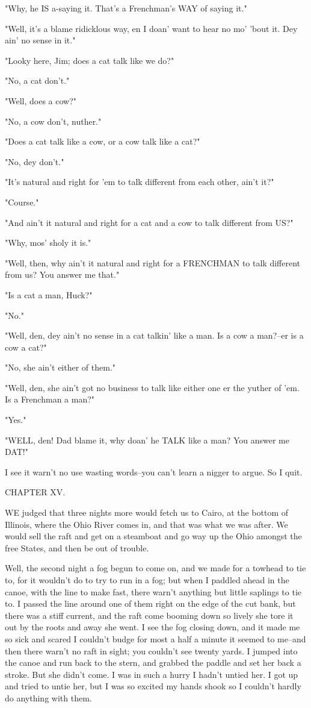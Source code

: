 "Why, he IS a-saying it.  That's a Frenchman's WAY of saying it."

"Well, it's a blame ridicklous way, en I doan' want to hear no mo' 'bout
it.  Dey ain' no sense in it."

"Looky here, Jim; does a cat talk like we do?"

"No, a cat don't."

"Well, does a cow?"

"No, a cow don't, nuther."

"Does a cat talk like a cow, or a cow talk like a cat?"

"No, dey don't."

"It's natural and right for 'em to talk different from each other, ain't
it?"

"Course."

"And ain't it natural and right for a cat and a cow to talk different
from US?"

"Why, mos' sholy it is."

"Well, then, why ain't it natural and right for a FRENCHMAN to talk
different from us?  You answer me that."

"Is a cat a man, Huck?"

"No."

"Well, den, dey ain't no sense in a cat talkin' like a man.  Is a cow a
man?--er is a cow a cat?"

"No, she ain't either of them."

"Well, den, she ain't got no business to talk like either one er the
yuther of 'em.  Is a Frenchman a man?"

"Yes."

"WELL, den!  Dad blame it, why doan' he TALK like a man?  You answer me
DAT!"

I see it warn't no use wasting words--you can't learn a nigger to argue.
So I quit.




CHAPTER XV.

WE judged that three nights more would fetch us to Cairo, at the bottom
of Illinois, where the Ohio River comes in, and that was what we was
after.  We would sell the raft and get on a steamboat and go way up the
Ohio amongst the free States, and then be out of trouble.

Well, the second night a fog begun to come on, and we made for a towhead
to tie to, for it wouldn't do to try to run in a fog; but when I paddled
ahead in the canoe, with the line to make fast, there warn't anything but
little saplings to tie to.  I passed the line around one of them right on
the edge of the cut bank, but there was a stiff current, and the raft
come booming down so lively she tore it out by the roots and away she
went.  I see the fog closing down, and it made me so sick and scared I
couldn't budge for most a half a minute it seemed to me--and then there
warn't no raft in sight; you couldn't see twenty yards.  I jumped into
the canoe and run back to the stern, and grabbed the paddle and set her
back a stroke.  But she didn't come.  I was in such a hurry I hadn't
untied her.  I got up and tried to untie her, but I was so excited my
hands shook so I couldn't hardly do anything with them.

